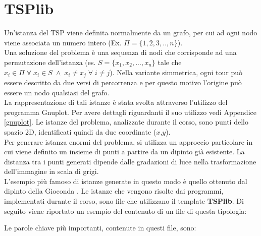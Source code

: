 \chapter{TSPlib}\label{TSPlib}
Un'istanza del TSP viene definita normalmente da un grafo, per cui ad ogni nodo viene associata un numero intero (Ex. $\Pi = \{1,2,3,..,n\}$). \\
Una soluzione del problema è una sequenza di nodi che corrisponde ad una permutazione dell'istanza (es. $S = \{x_1,x_2,...,x_n\}$ tale che $x_i \in \Pi\;\forall\;x_i\in S\;\wedge\; x_i\neq x_j\;\forall\;i\neq j$). Nella variante simmetrica, ogni tour può essere descritto da due versi di percorrenza e per questo motivo l'origine può essere un nodo qualsiasi del grafo.\\
La rappresentazione di tali istanze è stata svolta attraverso l'utilizzo del programma Gnuplot. Per avere dettagli riguardanti il suo utilizzo vedi Appendice \ref{gnuplot}. Le istanze del problema, analizzate durante il corso, sono punti dello spazio 2D, identificati quindi da due coordinate ($x$,$y$).\\
Per generare istanza enormi del problema, si utilizza un approccio particolare in cui viene definito un insieme di punti a partire da un dipinto già esistente. La distanza tra i punti generati dipende dalle gradazioni di luce nella trasformazione dell'immagine in scala di grigi.\\
L'esempio più famoso di istanze generate in questo modo è quello ottenuto dal dipinto della Gioconda \cite{monnalisa}.
Le istanze che vengono risolte dai programmi, implementati durante il corso, sono file che utilizzano il template \textbf{TSPlib}. Di seguito viene riportato un esempio del contenuto di un file di questa tipologia: 

Le parole chiave più importanti, contenute in questi file, sono:\\
